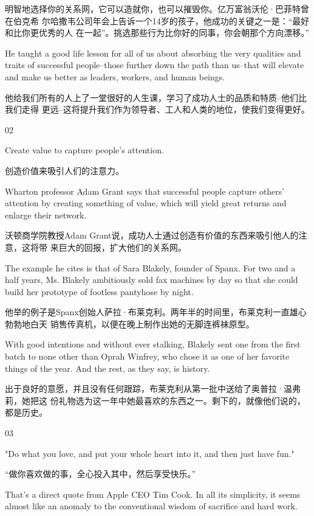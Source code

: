 \documentclass[11pt]{ctexart}
\begin{document}
{{{{明智地选择你的关系网，它可以造就你，也可以摧毁你。亿万富翁沃伦·巴菲特曾在伯克希
尔哈撒韦公司年会上告诉一个14岁的孩子，他成功的关键之一是：“最好和比你更优秀的人
在一起”。挑选那些行为比你好的同事，你会朝那个方向漂移。”

He taught a good life lesson for all of us about absorbing the very qualities
and traits of successful people--those further down the path than us--that will
elevate and make us better as leaders, workers, and human beings.

他给我们所有的人上了一堂很好的人生课，学习了成功人士的品质和特质--他们比我们走得
更远--这将提升我们作为领导者、工人和人类的地位，使我们变得更好。

02

Create value to capture people's attention.

创造价值来吸引人们的注意力。



Wharton professor Adam Grant says that successful people capture others'
attention by creating something of value, which will yield great returns and
enlarge their network.

沃顿商学院教授Adam Grant说，成功人士通过创造有价值的东西来吸引他人的注意，这将带
来巨大的回报，扩大他们的关系网。

The example he cites is that of Sara Blakely, founder of Spanx. For two and a
half years, Ms. Blakely ambitiously sold fax machines by day so that she could
build her prototype of footless pantyhose by night.

他举的例子是Spanx创始人萨拉·布莱克利。两年半的时间里，布莱克利一直雄心勃勃地白天
销售传真机，以便在晚上制作出她的无脚连裤袜原型。

With good intentions and without ever stalking, Blakely sent one from the first
batch to none other than Oprah Winfrey, who chose it as one of her favorite
things of the year. And the rest, as they say, is history.

出于良好的意愿，并且没有任何跟踪，布莱克利从第一批中送给了奥普拉·温弗莉，她把这
份礼物选为这一年中她最喜欢的东西之一。剩下的，就像他们说的，都是历史。

03

"Do what you love, and put your whole heart into it, and then just have fun."

“做你喜欢做的事，全心投入其中，然后享受快乐。”



That's a direct quote from Apple CEO Tim Cook. In all its simplicity, it seems
almost like an anomaly to the conventional wisdom of sacrifice and hard work.

}}}}
\end{document}
